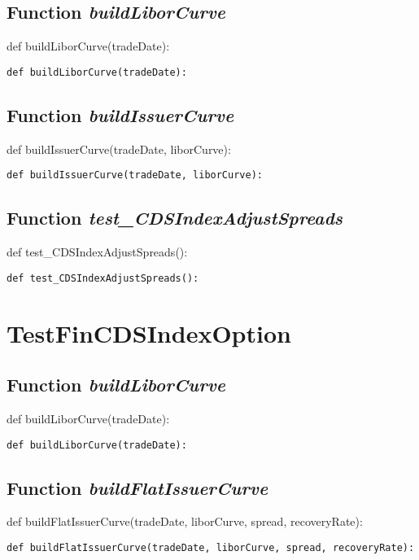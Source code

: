 \documentclass[twoside,11pt]{book}
\begin{document}
\subsection{Function {\it buildLiborCurve}}
def buildLiborCurve(tradeDate):

\begin{lstlisting}
def buildLiborCurve(tradeDate):
\end{lstlisting}

\subsection{Function {\it buildIssuerCurve}}
def buildIssuerCurve(tradeDate, liborCurve):

\begin{lstlisting}
def buildIssuerCurve(tradeDate, liborCurve):
\end{lstlisting}

\subsection{Function {\it test\_CDSIndexAdjustSpreads}}
def test\_CDSIndexAdjustSpreads():

\begin{lstlisting}
def test_CDSIndexAdjustSpreads():
\end{lstlisting}


\newpage
\section{TestFinCDSIndexOption}

\subsection{Function {\it buildLiborCurve}}
def buildLiborCurve(tradeDate):

\begin{lstlisting}
def buildLiborCurve(tradeDate):
\end{lstlisting}

\subsection{Function {\it buildFlatIssuerCurve}}
def buildFlatIssuerCurve(tradeDate, liborCurve, spread, recoveryRate):

\begin{lstlisting}
def buildFlatIssuerCurve(tradeDate, liborCurve, spread, recoveryRate):
\end{lstlisting}
\end{document}
